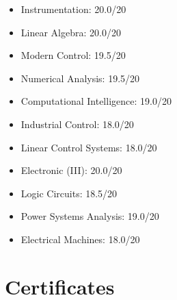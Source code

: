 \documentclass[11pt,a4paper,sans]{moderncv} %
\begin{document}
\begin{cvcolumns}
    {
        \begin{itemize}
            \item \href{https://aut.ac.ir/en}{} Instrumentation: 20.0/20
            \item \href{https://aut.ac.ir/en}{} Linear Algebra: 20.0/20
            \item \href{https://aut.ac.ir/en}{} Modern Control: 19.5/20
            \item \href{https://aut.ac.ir/en}{} Numerical Analysis: 19.5/20
            \item \href{https://aut.ac.ir/en}{} Computational Intelligence: 19.0/20
            \item \href{https://aut.ac.ir/en}{} Industrial Control: 18.0/20
            \item \href{https://aut.ac.ir/en}{} Linear Control Systems: 18.0/20
            \item \href{https://aut.ac.ir/en}{} Electronic (III): 20.0/20
            \item \href{https://aut.ac.ir/en}{} Logic Circuits: 18.5/20
            \item \href{https://aut.ac.ir/en}{} Power Systems Analysis: 19.0/20
            \item \href{https://aut.ac.ir/en}{} Electrical Machines: 18.0/20   
        \end{itemize}
    }
\end{cvcolumns}

	\section{Certificates}
    			
\end{document}
